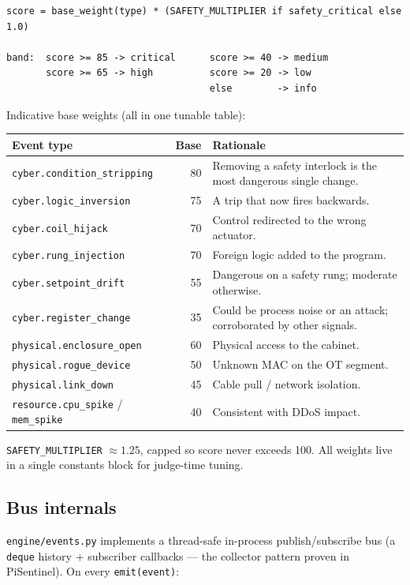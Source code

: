 \documentclass[11pt,a4paper]{article}
\newcommand{\code}[1]{\texttt{\small #1}}
\begin{document}
\begin{lstlisting}
score = base_weight(type) * (SAFETY_MULTIPLIER if safety_critical else 1.0)

band:  score >= 85 -> critical      score >= 40 -> medium
       score >= 65 -> high          score >= 20 -> low
                                    else        -> info
\end{lstlisting}

Indicative base weights (all in one tunable table):

\begin{tabularx}{\textwidth}{@{}L r L@{}}
\toprule
\textbf{Event type} & \textbf{Base} & \textbf{Rationale} \\
\midrule
\code{cyber.condition\_stripping} & 80 & Removing a safety interlock is the most dangerous single change. \\
\code{cyber.logic\_inversion} & 75 & A trip that now fires backwards. \\
\code{cyber.coil\_hijack} & 70 & Control redirected to the wrong actuator. \\
\code{cyber.rung\_injection} & 70 & Foreign logic added to the program. \\
\code{cyber.setpoint\_drift} & 55 & Dangerous on a safety rung; moderate otherwise. \\
\code{cyber.register\_change} & 35 & Could be process noise or an attack; corroborated by other signals. \\
\code{physical.enclosure\_open} & 60 & Physical access to the cabinet. \\
\code{physical.rogue\_device} & 50 & Unknown MAC on the OT segment. \\
\code{physical.link\_down} & 45 & Cable pull / network isolation. \\
\code{resource.cpu\_spike} / \code{mem\_spike} & 40 & Consistent with DDoS impact. \\
\bottomrule
\end{tabularx}

\smallskip
\code{SAFETY\_MULTIPLIER} $\approx 1.25$, capped so score never exceeds 100. All weights live in a
single constants block for judge-time tuning.

\subsection{Bus internals}
\code{engine/events.py} implements a thread-safe in-process publish/subscribe bus (a \code{deque}
history + subscriber callbacks --- the collector pattern proven in PiSentinel). On every
\code{emit(event)}:
\end{document}
